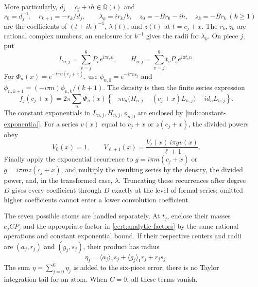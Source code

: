 More particularly, $d_j=c_j+ih\in\mathbb Q(i)$ and
\begin{equation}\label{ind:kernel-recurrences}
 r_0=d_j^{-1},\quad r_{k+1}=-r_k/d_j,\qquad
 \lambda_k=ir_k/b,\quad z_0=-Br_0-ih,\quad z_k=-Br_k\ (k\ge1)
\end{equation}
are the coefficients of $(t+ih)^{-1}$, $\lambda(t)$, and $z(t)$ at
$t=c_j+x$.  The $r_k,z_k$ are rational complex numbers; an enclosure for
$b^{-1}$ gives the radii for $\lambda_k$.  On piece $j$, put
\[
 L_{n,j}=\sum_{v=j}^6P_v e^{i\pi t_vn},\qquad
 H_{n,j}=\sum_{v=j}^6t_vP_v e^{i\pi t_vn}.
\]
For $\Phi_n(x)=e^{-i\pi n(c_j+x)}$, use
$\phi_{n,0}=e^{-i\pi nc_j}$ and
$\phi_{n,k+1}=(-i\pi n)\phi_{n,k}/(k+1)$.  The density is then the finite
series expression
\begin{equation}\label{ind:density-recurrence}
 f_j(c_j+x)=2\pi\sum_n\Phi_n(x)
   \left\{-\pi c_n\bigl(H_{n,j}-(c_j+x)L_{n,j}\bigr)+id_nL_{n,j}\right\}.
\end{equation}
The constant exponentials in $L_{n,j},H_{n,j},\phi_{n,0}$ are enclosed by
\eqref{ind:constant-exponential}.  For a series $v(x)$ equal to $c_j+x$
or $z(c_j+x)$, the divided powers obey
\begin{equation}\label{ind:divided-power-recurrence}
 V_0(x)=1,\qquad V_{\ell+1}(x)=
       \frac{V_\ell(x)\,i\pi y v(x)}{\ell+1}.
\end{equation}
Finally apply the exponential recurrence to $g=i\pi m(c_j+x)$ or
$g=i\pi m z(c_j+x)$, and multiply the resulting series by the density,
the divided power, and, in the transformed case, $\lambda$.  Truncating
these recurrences after degree $D$ gives every coefficient through $D$
exactly at the level of formal series; omitted higher coefficients cannot
enter a lower convolution coefficient.

The seven possible atoms are handled separately.  At $t_j$, enclose their
masses $e_jCP_j$ and the appropriate factor in
\eqref{cert:analytic-factors} by the same rational operations and constant
exponential bound.  If their respective centers and radii are
$(a_j,r_j)$ and $(g_j,s_j)$, their product has radius
\begin{equation}\label{ind:atom-radii}
 \eta_j=\langle a_j\rangle_1s_j+\langle g_j\rangle_1r_j+r_js_j.
\end{equation}
The sum $\eta=\sum_{j=0}^6\eta_j$ is added to the six-piece error; there is
no Taylor integration tail for an atom.  When $C=0$, all these terms vanish.

